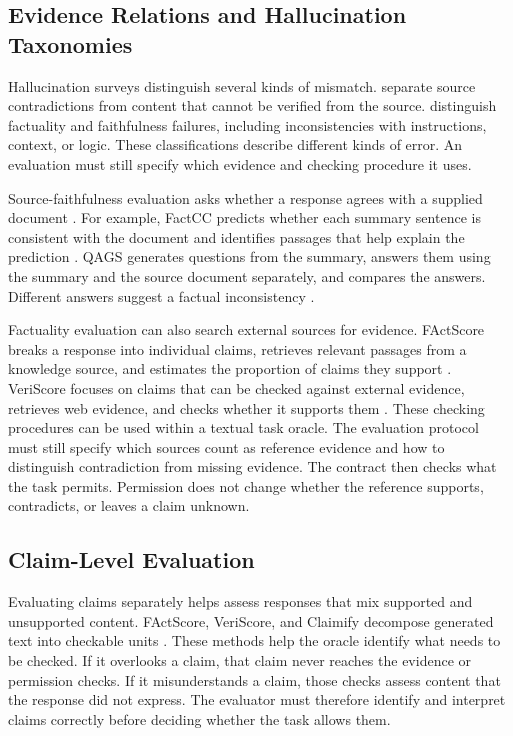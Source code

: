 \documentclass{clv2025}
\begin{document}
\subsection{Evidence Relations and Hallucination Taxonomies}

Hallucination surveys distinguish several kinds of mismatch.
\citet{ji_survey_2023} separate source contradictions from content that cannot
be verified from the source. \citet{huang_survey_2025} distinguish factuality
and faithfulness failures, including inconsistencies with instructions,
context, or logic. These classifications describe different kinds of error.
An evaluation must still specify which evidence and checking procedure it uses.

Source-faithfulness evaluation asks whether a response agrees with a supplied
document \citep{maynez_faithfulness_2020}. For example, FactCC predicts whether
each summary sentence is consistent with the document and identifies
passages that help explain the prediction \citep{kryscinski_evaluating_2020}.
QAGS generates questions from the summary, answers them using the summary
and the source document separately, and compares the answers. Different
answers suggest a factual inconsistency \citep{wang_asking_2020}.

Factuality evaluation can also search external sources for evidence.
FActScore breaks a response into individual claims, retrieves relevant
passages from a knowledge source, and estimates the proportion of claims
they support \citep{min_factscore_2023}. VeriScore focuses on claims that
can be checked against external evidence, retrieves web evidence, and
checks whether it supports them \citep{song_veriscore_2024}.
These checking procedures can be used within a textual task oracle.
The evaluation protocol must still specify which sources count as reference
evidence and how to distinguish contradiction from missing evidence.
The contract then checks what the task permits. Permission does not change
whether the reference supports, contradicts, or leaves a claim unknown.

\subsection{Claim-Level Evaluation}\label{subsec:extraction}

Evaluating claims separately helps assess responses that mix supported and
unsupported content.
FActScore, VeriScore, and Claimify decompose generated text into checkable units
\citep{min_factscore_2023,song_veriscore_2024,metropolitansky_claimify_2025}.
These methods help the oracle identify what needs to be checked. If it
overlooks a claim, that claim never reaches the evidence or permission
checks. If it misunderstands a claim, those checks assess content that the
response did not express. The evaluator must therefore identify and
interpret claims correctly before deciding whether the task allows them.
\end{document}
